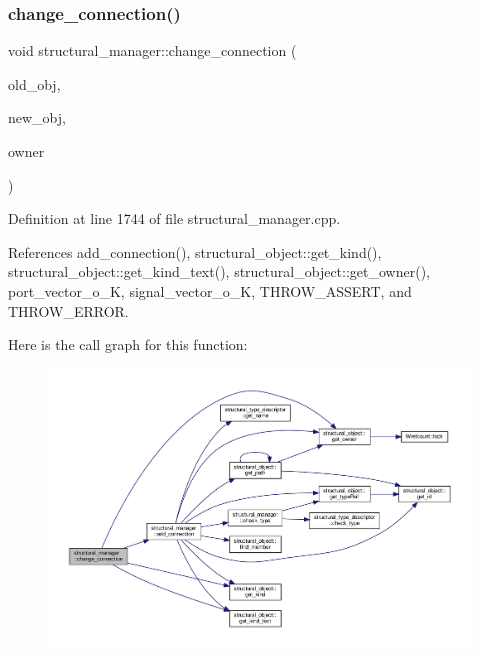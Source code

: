 \subsubsection{\texorpdfstring{change\+\_\+connection()}{change\_connection()}}
{\footnotesize\ttfamily void structural\+\_\+manager\+::change\+\_\+connection (\begin{DoxyParamCaption}\item[{\hyperlink{structural__objects_8hpp_a8ea5f8cc50ab8f4c31e2751074ff60b2}{structural\+\_\+object\+Ref}}]{old\+\_\+obj,  }\item[{\hyperlink{structural__objects_8hpp_a8ea5f8cc50ab8f4c31e2751074ff60b2}{structural\+\_\+object\+Ref}}]{new\+\_\+obj,  }\item[{\hyperlink{structural__objects_8hpp_a8ea5f8cc50ab8f4c31e2751074ff60b2}{structural\+\_\+object\+Ref}}]{owner }\end{DoxyParamCaption})}



Definition at line 1744 of file structural\+\_\+manager.\+cpp.



References add\+\_\+connection(), structural\+\_\+object\+::get\+\_\+kind(), structural\+\_\+object\+::get\+\_\+kind\+\_\+text(), structural\+\_\+object\+::get\+\_\+owner(), port\+\_\+vector\+\_\+o\+\_\+K, signal\+\_\+vector\+\_\+o\+\_\+K, T\+H\+R\+O\+W\+\_\+\+A\+S\+S\+E\+RT, and T\+H\+R\+O\+W\+\_\+\+E\+R\+R\+OR.

Here is the call graph for this function\+:
\nopagebreak
\begin{figure}[H]
\begin{center}
\leavevmode
\includegraphics[width=350pt]{d7/d6b/classstructural__manager_a0f66e3ac5c1075e8600c1ac69846866c_cgraph}
\end{center}
\end{figure}
\mbox{\label{classstructural__manager_a8925f8cfa41428e1221c2fead8ce10ec}} 
